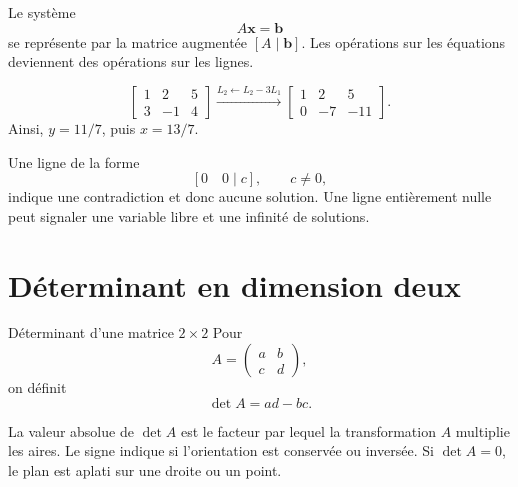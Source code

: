 Le système
\[
A\mathbf x=\mathbf b
\]
se représente par la matrice augmentée $[A\mid\mathbf b]$. Les opérations sur les équations deviennent des opérations sur les lignes.

\begin{examplebox}
\[
\left[
\begin{array}{cc|c}
1&2&5\\
3&-1&4
\end{array}
\right]
\xrightarrow{L_2\leftarrow L_2-3L_1}
\left[
\begin{array}{cc|c}
1&2&5\\
0&-7&-11
\end{array}
\right].
\]
Ainsi, $y=11/7$, puis $x=13/7$.
\end{examplebox}

Une ligne de la forme
\[
[0\quad0\mid c],\qquad c\neq0,
\]
indique une contradiction et donc aucune solution. Une ligne entièrement nulle peut signaler une variable libre et une infinité de solutions.

\section{Déterminant en dimension deux}
\label{manual:section:12.04}

\begin{definition}{Déterminant d'une matrice $2\times2$}{}
Pour
\[
A=\begin{pmatrix}a&b\\c&d\end{pmatrix},
\]
on définit
\[
\det A=ad-bc.
\]
\end{definition}

\begin{intuitionbox}
La valeur absolue de $\det A$ est le facteur par lequel la transformation $A$ multiplie les aires. Le signe indique si l'orientation est conservée ou inversée. Si $\det A=0$, le plan est aplati sur une droite ou un point.
\end{intuitionbox}

\begin{center}
\end{center}

